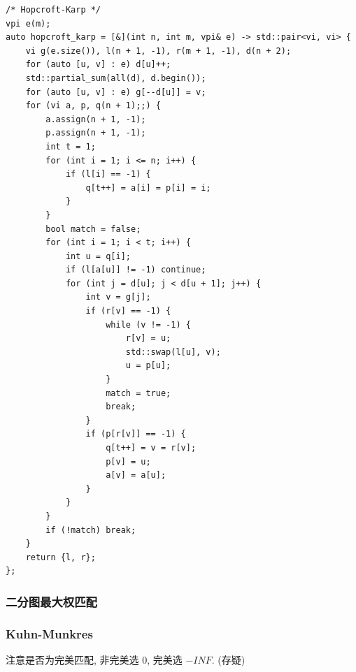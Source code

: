 \documentclass[UTF8, a4paper, titlepage, twoside]{ctexart}
\begin{document}
\begin{lstlisting}[style=cpp]
/* Hopcroft-Karp */
vpi e(m);
auto hopcroft_karp = [&](int n, int m, vpi& e) -> std::pair<vi, vi> {
    vi g(e.size()), l(n + 1, -1), r(m + 1, -1), d(n + 2);
    for (auto [u, v] : e) d[u]++;
    std::partial_sum(all(d), d.begin());
    for (auto [u, v] : e) g[--d[u]] = v;
    for (vi a, p, q(n + 1);;) {
        a.assign(n + 1, -1);
        p.assign(n + 1, -1);
        int t = 1;
        for (int i = 1; i <= n; i++) {
            if (l[i] == -1) {
                q[t++] = a[i] = p[i] = i;
            }
        }
        bool match = false;
        for (int i = 1; i < t; i++) {
            int u = q[i];
            if (l[a[u]] != -1) continue;
            for (int j = d[u]; j < d[u + 1]; j++) {
                int v = g[j];
                if (r[v] == -1) {
                    while (v != -1) {
                        r[v] = u;
                        std::swap(l[u], v);
                        u = p[u];
                    }
                    match = true;
                    break;
                }
                if (p[r[v]] == -1) {
                    q[t++] = v = r[v];
                    p[v] = u;
                    a[v] = a[u];
                }
            }
        }
        if (!match) break;
    }
    return {l, r};
};
\end{lstlisting}

\subsubsection*{ 二分图最大权匹配 }
\subsubsection*{ Kuhn-Munkres }
注意是否为完美匹配, 非完美选 \(0\), 完美选 \(-INF\). (存疑)
\end{document}
